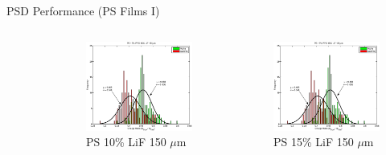 \begin{frame}{PSD Performance (PS Films I)}
\begin{columns}[onlytextwidth]
\begin{column}{0.25\textwidth}
\begin{figure}
		\caption{PS 10\% LiF 50 $\mu$m}
	\end{figure}
\end{column}
\begin{column}{0.25\textwidth}
	\tiny
	\begin{figure}
		\centering
		\includegraphics[width=\textwidth]{images/ChargeIntegration_PS_LiF_POP_151um.eps}
		\caption{PS 10\% LiF 150 $\mu$m}
	\end{figure}
\end{column}
\begin{column}{0.25\textwidth}
	\tiny
	\begin{figure}
		\centering
		\includegraphics[width=\textwidth]{images/ChargeIntegration_PS_LiF15_POP_151um.eps}
		\caption{PS 15\% LiF 150 $\mu$m}
	\end{figure}
\end{column}
\end{columns}
\end{frame}
